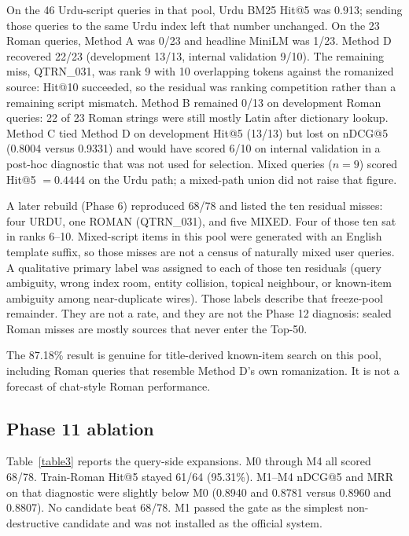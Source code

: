 \documentclass[10pt,letterpaper]{article}
\begin{document}
On the 46 Urdu-script queries in that pool, Urdu BM25 Hit@5 was 0.913; sending those queries to the same Urdu index left that number unchanged. On the 23 Roman queries, Method A was 0/23 and headline MiniLM was 1/23. Method D recovered 22/23 (development 13/13, internal validation 9/10). The remaining miss, QTRN\_031, was rank 9 with 10 overlapping tokens against the romanized source: Hit@10 succeeded, so the residual was ranking competition rather than a remaining script mismatch. Method B remained 0/13 on development Roman queries: 22 of 23 Roman strings were still mostly Latin after dictionary lookup. Method C tied Method D on development Hit@5 (13/13) but lost on nDCG@5 (0.8004 versus 0.9331) and would have scored 6/10 on internal validation in a post-hoc diagnostic that was not used for selection. Mixed queries ($n = 9$) scored Hit@5 $= 0.4444$ on the Urdu path; a mixed-path union did not raise that figure.

A later rebuild (Phase 6) reproduced 68/78 and listed the ten residual misses: four URDU, one ROMAN (QTRN\_031), and five MIXED. Four of those ten sat in ranks 6--10. Mixed-script items in this pool were generated with an English template suffix, so those misses are not a census of naturally mixed user queries. A qualitative primary label was assigned to each of those ten residuals (query ambiguity, wrong index room, entity collision, topical neighbour, or known-item ambiguity among near-duplicate wires). Those labels describe that freeze-pool remainder. They are not a rate, and they are not the Phase 12 diagnosis: sealed Roman misses are mostly sources that never enter the Top-50.

The 87.18\% result is genuine for title-derived known-item search on this pool, including Roman queries that resemble Method D's own romanization. It is not a forecast of chat-style Roman performance.

\subsection*{Phase 11 ablation}

Table~\ref{table3} reports the query-side expansions. M0 through M4 all scored 68/78. Train-Roman Hit@5 stayed 61/64 (95.31\%). M1--M4 nDCG@5 and MRR on that diagnostic were slightly below M0 (0.8940 and 0.8781 versus 0.8960 and 0.8807). No candidate beat 68/78. M1 passed the gate as the simplest non-destructive candidate and was not installed as the official system.
\end{document}
